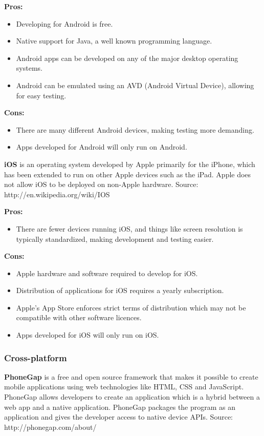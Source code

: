 \indent
  {\bf Pros:}
  \begin{itemize}
    \item Developing for Android is free.
    \item Native support for Java, a well known programming language.
    \item Android apps can be developed on any of the major desktop operating
          systems.
    \item Android can be emulated using an AVD (Android Virtual Device),
          allowing for easy testing.
  \end{itemize}

\indent
  {\bf Cons:}
  \begin{itemize}
    \item There are many different Android devices, making testing more
          demanding.
    \item Apps developed for Android will only run on Android.
  \end{itemize}

\noindent
{\bf iOS} is an operating system developed by Apple primarily for the iPhone,
which has been extended to run on other Apple devices such as the iPad. Apple
does not allow iOS to be deployed on non-Apple hardware.
Source: http://en.wikipedia.org/wiki/IOS

\indent
  {\bf Pros:}
  \begin{itemize}
    \item There are fewer devices running iOS, and things like screen
          resolution is typically standardized, making development and testing
          easier.
  \end{itemize}

\indent
  {\bf Cons:}
  \begin{itemize}
    \item Apple hardware and software required to develop for iOS.
    \item Distribution of applications for iOS requires a yearly subscription.
    \item Apple's App Store enforces strict terms of distribution which may not
          be compatible with other software licences.
    \item Apps developed for iOS will only run on iOS.
  \end{itemize}


\subsubsection{Cross-platform}
{\bf PhoneGap} is a free and open source framework that makes it possible
to create mobile applications using web technologies like HTML, CSS and
JavaScript. PhoneGap allows developers to create an application which is a
hybrid between a web app and a native application. PhoneGap packages the
program as an application and gives the developer access to native device APIs.
Source: http://phonegap.com/about/

